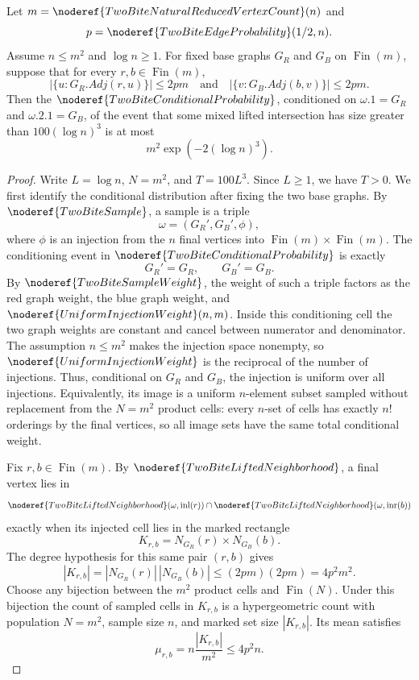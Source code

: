 \begin{helper}[FiberAndDegreeMixedLiftedIntersectionUniformBound]
\label{helper:FiberAndDegreeMixedLiftedIntersectionUniformBound}
Let \(m=\noderef{TwoBiteNaturalReducedVertexCount}(n)\) and
\[
p=\noderef{TwoBiteEdgeProbability}(1/2,n).
\]
Assume \(n\le m^2\) and \(\log n\ge1\).  For fixed base graphs \(G_R\) and
\(G_B\) on \(\operatorname{Fin}(m)\), suppose that for every
\(r,b\in\operatorname{Fin}(m)\),
\[
|\{u:G_R.Adj(r,u)\}|\le2pm
\quad\text{and}\quad
|\{v:G_B.Adj(b,v)\}|\le2pm .
\]
Then the \(\noderef{TwoBiteConditionalProbability}\), conditioned on
\(\omega.1=G_R\) and \(\omega.2.1=G_B\), of the event that some mixed lifted
intersection has size greater than \(100(\log n)^3\) is at most
\[
m^2\exp(-2(\log n)^3).
\]
\end{helper}

\begin{proof}
Write \(L=\log n\), \(N=m^2\), and \(T=100L^3\).  Since \(L\ge1\), we have
\(T>0\).  We first identify the conditional distribution after fixing the
two base graphs.  By \(\noderef{TwoBiteSample}\), a sample is a triple
\[
\omega=(G_R',G_B',\phi),
\]
where \(\phi\) is an injection from the \(n\) final vertices into
\(\operatorname{Fin}(m)\times\operatorname{Fin}(m)\).  The conditioning event
in \(\noderef{TwoBiteConditionalProbability}\) is exactly
\[
G_R'=G_R,\qquad G_B'=G_B.
\]
By \(\noderef{TwoBiteSampleWeight}\), the weight of such a triple factors as
the red graph weight, the blue graph weight, and
\(\noderef{UniformInjectionWeight}(n,m)\).  Inside this conditioning cell the
two graph weights are constant and cancel between numerator and denominator.
The assumption \(n\le m^2\) makes the injection space nonempty, so
\(\noderef{UniformInjectionWeight}\) is the reciprocal of the number of
injections.  Thus, conditional on \(G_R\) and \(G_B\), the injection is
uniform over all injections.  Equivalently, its image is a uniform
\(n\)-element subset sampled without replacement from the \(N=m^2\) product
cells: every \(n\)-set of cells has exactly \(n!\) orderings by the final
vertices, so all image sets have the same total conditional weight.

Fix \(r,b\in\operatorname{Fin}(m)\).  By
\(\noderef{TwoBiteLiftedNeighborhood}\), a final vertex lies in
\[
\noderef{TwoBiteLiftedNeighborhood}(\omega,\operatorname{inl}(r))
\cap
\noderef{TwoBiteLiftedNeighborhood}(\omega,\operatorname{inr}(b))
\]
exactly when its injected cell lies in the marked rectangle
\[
K_{r,b}=N_{G_R}(r)\times N_{G_B}(b).
\]
The degree hypothesis for this same pair \((r,b)\) gives
\[
|K_{r,b}|
=|N_{G_R}(r)|\,|N_{G_B}(b)|
\le (2pm)(2pm)=4p^2m^2.
\tag{1}
\]
Choose any bijection between the \(m^2\) product cells and
\(\operatorname{Fin}(N)\).  Under this bijection the count of sampled cells
in \(K_{r,b}\) is a hypergeometric count with population \(N=m^2\), sample
size \(n\), and marked set size \(|K_{r,b}|\).  Its mean satisfies
\[
\mu_{r,b}=n\frac{|K_{r,b}|}{m^2}\le 4p^2n.
\tag{2}
\]


\end{proof}
